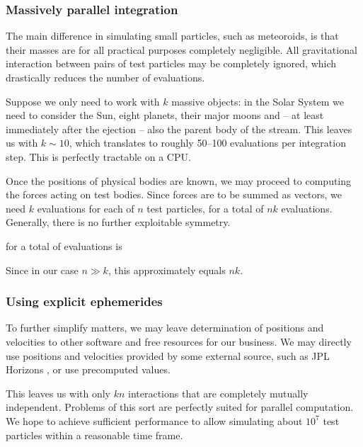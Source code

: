         \subsubsection{Massively parallel integration} \label{asip}
            The main difference in simulating small particles, such as meteoroids,
            is that their masses are for all practical purposes completely negligible.
            All gravitational interaction between pairs of test particles may be completely ignored,
            which drastically reduces the number of evaluations.

            Suppose we only need to work with $k$ massive objects:
            in the Solar System we need to consider the Sun, eight planets, their major moons
            and -- at least immediately after the ejection -- also the parent body of the stream.
            This leaves us with $k \sim 10$, which translates to roughly 50--100 evaluations per integration step.
            This is perfectly tractable on a CPU.

            Once the positions of physical bodies are known, we may proceed to computing the forces acting
            on test bodies. Since forces are to be summed as vectors, we need $k$ evaluations
            for each of $n$ test particles, for a total of $nk$ evaluations.
            Generally, there is no further exploitable symmetry.

            for a total of evaluations is

            Since in our case $n \gg k$, this approximately equals $nk$.

        \subsubsection{Using explicit ephemerides} \label{asie}
            To further simplify matters, we may leave determination of positions and velocities to other software
            and free resources for our business.
            We may directly use positions and velocities provided by some external source, such as JPL Horizons \cite{...},
            or use precomputed values.

            This leaves us with only $kn$ interactions that are completely mutually independent.
            Problems of this sort are perfectly suited for parallel computation.
            We hope to achieve sufficient performance to allow simulating about $10^7$ test particles within
            a reasonable time frame.

